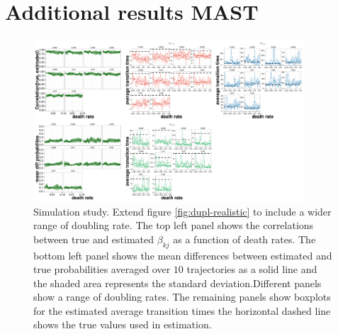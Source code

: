 \chapter{Additional results MAST}

\begin{figure}[h]
      \centering \includegraphics[width=0.9\textwidth]{pics/devide-2.pdf}
    \caption{Simulation study. Extend figure \ref{fig:dupl-realistic} to include a wider range of doubling rate. The top
left panel shows the correlations between true and estimated $\beta_{kj}$ as a function of death rates. The bottom left
panel shows the mean differences between estimated and true probabilities averaged over $10$ trajectories as a solid
line and the shaded area represents the standard deviation.Different panels show a range of doubling rates. The
remaining panels show boxplots for the estimated average transition times the horizontal dashed line shows the true
values used in estimation. }
    \label{fig:dupl-all}
\end{figure}



